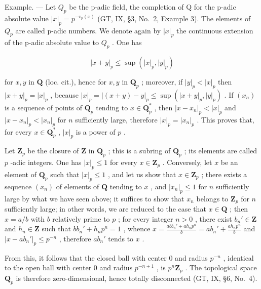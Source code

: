 Example. --- Let \(Q_{p}\) be the p-adic field, the completion of Q for the p-adic absolute value \(|x|_{p} = p^{-v_{p}(x)}\) (GT, IX, §3, No.~2, Example 3). The elements of \(Q_{p}\) are called p-adic numbers. We denote again by \(|x|_{p}\) the continuous extension of the p-adic absolute value to \(Q_{p}\) . One has

\[
| x + y | _ {p} \leqslant \sup (| x | _ {p}, | y | _ {p})
\]

for \(x, y\) in \(\mathbf{Q}\) (loc. cit.), hence for \(x, y\) in \(\mathbf{Q}_p\) ; moreover, if \(|y|_p < |x|_p\) then \(|x + y|_p = |x|_p\) , because \(|x|_p = |(x + y) - y|_p \leqslant \sup(|x + y|_p, |y|_p)\) . If \((x_n)\) is a sequence of points of \(\mathbf{Q}_p\) tending to \(x \in \mathbf{Q}_p^*\) , then \(|x - x_n|_p < |x|_p\) and \(|x - x_n|_p < |x_n|_p\) for \(n\) sufficiently large, therefore \(|x|_p = |x_n|_p\) . This proves that, for every \(x \in \mathbf{Q}_p^*\) , \(|x|_p\) is a power of \(p\) .

Let \(\mathbf{Z}_p\) be the closure of \(\mathbf{Z}\) in \(\mathbf{Q}_p\) ; this is a subring of \(\mathbf{Q}_p\) ; its elements are called \(p\) -adic integers. One has \(|x|_p \leqslant 1\) for every \(x \in \mathbf{Z}_p\) . Conversely, let \(x\) be an element of \(\mathbf{Q}_p\) such that \(|x|_p \leqslant 1\) , and let us show that \(x \in \mathbf{Z}_p\) ; there exists a sequence \((x_n)\) of elements of \(\mathbf{Q}\) tending to \(x\) , and \(|x_n|_p \leqslant 1\) for \(n\) sufficiently large by what we have seen above; it suffices to show that \(x_n\) belongs to \(\mathbf{Z}_p\) for \(n\) sufficiently large; in other words, we are reduced to the case that \(x \in \mathbf{Q}\) ; then \(x = a/b\) with \(b\) relatively prime to \(p\) ; for every integer \(n > 0\) , there exist \(b_n' \in \mathbf{Z}\) and \(h_n \in \mathbf{Z}\) such that \(bb_n' + h_np^n = 1\) , whence \(x = \frac{abb_n' + ah_np^n}{b} = ab_n' + \frac{ah_np^n}{b}\) and \(|x - ab_n'|_p \leqslant p^{-n}\) , therefore \(ab_n'\) tends to \(x\) .

From this, it follows that the closed ball with center 0 and radius \(p^{-n}\) , identical to the open ball with center 0 and radius \(p^{-n+1}\) , is \(p^n\mathbf{Z}_p\) . The topological space \(\mathbf{Q}_p\) is therefore zero-dimensional, hence totally disconnected (GT, IX, §6, No.~4).


